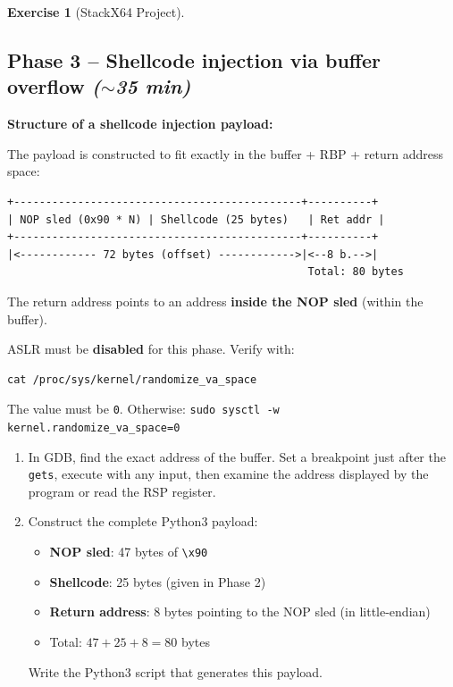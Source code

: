 \documentclass[a4paper,11pt]{article}
\theoremstyle{plain}
\theoremstyle{definition}
\newtheorem{exercice}{Exercise}
\begin{document}
\begin{exercice}[StackX64 Project]
\subsection*{Phase 3 -- Shellcode injection via buffer overflow \hfill\normalfont\textit{($\sim$35 min)}}

\begin{rappel}
\textbf{Structure of a shellcode injection payload:}

The payload is constructed to fit exactly in the buffer + RBP + return address space:

\begin{lstlisting}[style=GDBStyle]
+---------------------------------------------+----------+
| NOP sled (0x90 * N) | Shellcode (25 bytes)   | Ret addr |
+---------------------------------------------+----------+
|<------------ 72 bytes (offset) ------------>|<--8 b.-->|
                                               Total: 80 bytes
\end{lstlisting}

The return address points to an address \textbf{inside the NOP sled} (within the buffer).
\end{rappel}

\begin{attention}
ASLR must be \textbf{disabled} for this phase. Verify with:
\begin{lstlisting}[style=GDBStyle]
cat /proc/sys/kernel/randomize_va_space
\end{lstlisting}
The value must be \texttt{0}. Otherwise: \texttt{sudo sysctl -w kernel.randomize\_va\_space=0}
\end{attention}

\begin{enumerate}
\item[\textbf{3a)}] In GDB, find the exact address of the buffer. Set a breakpoint just after the \texttt{gets}, execute with any input, then examine the address displayed by the program or read the RSP register.

\item[\textbf{3b)}] Construct the complete Python3 payload:
\begin{itemize}
    \item \textbf{NOP sled}: 47 bytes of \texttt{\textbackslash x90}
    \item \textbf{Shellcode}: 25 bytes (given in Phase 2)
    \item \textbf{Return address}: 8 bytes pointing to the NOP sled (in little-endian)
    \item Total: $47 + 25 + 8 = 80$ bytes
\end{itemize}
Write the Python3 script that generates this payload.


\end{enumerate}
\end{exercice}
\end{document}
